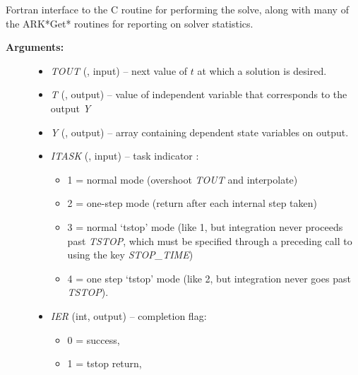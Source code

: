 \documentclass[letterpaper,10pt,english]{sphinxmanual}
\begin{document}
\begin{fulllineitems}
\label{f_interface/Usage:f/_/FARKODE}
Fortran interface to the C routine {\hyperref[c_interface/User_callable:c.ARKode]{\emph{}}}
for performing the solve, along with many of the ARK*Get*
routines for reporting on solver statistics.
\begin{description}
\item[{\textbf{Arguments:}}] \leavevmode\begin{itemize}
\item {} 
\emph{TOUT} (, input) -- next value of \(t\) at
which a solution is desired.

\item {} 
\emph{T} (, output) -- value of independent variable
that corresponds to the output \emph{Y}

\item {} 
\emph{Y} (, output) -- array containing dependent state
variables on output.

\item {} 
\emph{ITASK} (, input) -- task indicator :
\begin{itemize}
\item {} 
1 = normal mode (overshoot \emph{TOUT} and interpolate)

\item {} 
2 = one-step mode (return after each internal step taken)

\item {} 
3 = normal `tstop' mode (like 1, but integration never
proceeds past \emph{TSTOP}, which must be specified through a
preceding call to {\hyperref[f_interface/Usage:f/_/FARKSETRIN]{\emph{}}} using the key
\emph{STOP\_TIME})

\item {} 
4 = one step `tstop' mode (like 2, but integration never
goes past \emph{TSTOP}).

\end{itemize}

\item {} 
\emph{IER} (int, output) -- completion flag:
\begin{itemize}
\item {} 
0 = success,

\item {} 
1 = tstop return,


\end{itemize}
\end{itemize}
\end{description}
\end{fulllineitems}
\end{document}
